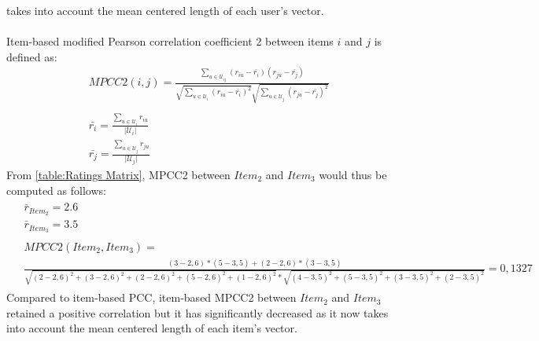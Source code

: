 takes into account the mean centered length of each user's vector.\\\\
Item-based modified Pearson correlation coefficient 2 between items $i$ and $j$ is defined as:
\begin{equation}
	\begin{split}
	&MPCC2(i,j) = \frac{\sum_{u \in \mathcal{U}_{ij}}(r_{iu}-\bar{r_{i}})(r_{ju}-\bar{r_{j}})}
					 {\sqrt{\sum_{u \in \mathcal{U}_{i}}(r_{iu}-\bar{r_{i}})^2}
					  \sqrt{\sum_{u \in \mathcal{U}_{j}}(r_{ju}-\bar{r_{j}})^2}} \\\\
	&\bar{r_{i}} = \frac{\sum_{u \in \mathcal{U}_i}r_{iu}}
						{\mathopen|\mathcal{U}_i\mathclose|}\\
	&\bar{r_{j}} = \frac{\sum_{u \in \mathcal{U}_j}r_{ju}}
						{\mathopen|\mathcal{U}_j\mathclose|}
\end{split}
\end{equation}
From \autoref{table:Ratings Matrix}, MPCC2
between $Item_2$ and $Item_3$ would thus be computed as follows:
\footnotesize
\begin{align*}
	\begin{split}
		&\bar{r}_{Item_2} = 2.6\\
		&\bar{r}_{Item_3} = 3.5\\\\
		&MPCC2(Item_2,Item_3) = \\&\frac{(3 - 2,6) * (5 - 3,5) + (2 - 2,6) * (3 - 3,5)}
								  {\sqrt{(2 - 2,6)^2 + (3 - 2,6)^2 + (2 - 2,6)^2 + (5 - 2,6)^2 + (1 - 2,6)^2 } *
								   \sqrt{(4 - 3,5)^2 + (5 - 3,5)^2 + (3 - 3,5)^2 + (2 - 3,5)^2 }} = 0,1327
	\end{split}
\end{align*}
\normalsize
Compared to item-based PCC, item-based MPCC2 between $Item_2$ and $Item_3$
retained a positive correlation but it has significantly decreased as it now
takes into account the mean centered length of each item's vector.
